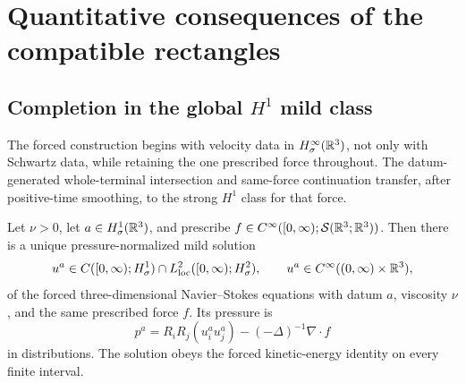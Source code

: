 \section{Quantitative consequences of the compatible rectangles}
\label{sec:quantitative-consequences}

\subsection[Completion in the global \texorpdfstring{\(H^1\)}{H1} mild class]
{Completion in the global \(H^1\) mild class}

The forced construction begins with velocity data in
\(H^\infty_\sigma(\mathbb R^3)\), not only with Schwartz data, while retaining the
one prescribed force throughout. The datum-generated whole-terminal
intersection and same-force continuation transfer, after positive-time
smoothing, to the strong \(H^1\) class for that force.

\begin{theorem}
\label{thm:qc-global-H1-completion}
Let \(\nu>0\), let \(a\in H^1_\sigma(\mathbb R^3)\), and prescribe
\(f\in C^\infty([0,\infty);\mathcal S(\mathbb R^3;\mathbb R^3))\). Then there is a unique
pressure-normalized mild solution
\begin{equation}
 u^a\in C([0,\infty);H^1_\sigma)
 \cap L^2_{\rm loc}([0,\infty);H^2_\sigma),
 \qquad
 u^a\in C^\infty((0,\infty)\times\mathbb R^3),
 \label{eq:qc-global-H1-class}
\end{equation}
of the forced three-dimensional Navier--Stokes equations with datum \(a\),
viscosity \(\nu\), and the same prescribed force \(f\).  Its pressure is
\[
 p^a=R_iR_j(u_i^a u_j^a)-(-\Delta)^{-1}\nabla\cdot f
\]
in distributions.  The solution obeys the forced kinetic-energy identity on
every finite interval.
\end{theorem}

